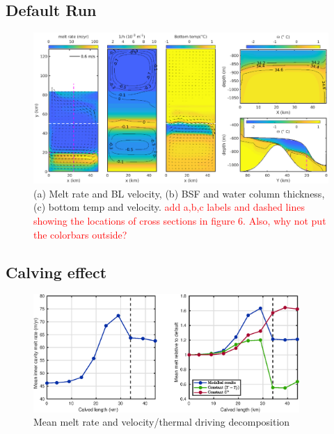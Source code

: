 \documentclass[draft]{agujournal2019}
\newcommand{\red}[1]{\textcolor{red}{#1}}
\begin{document}
\subsection{Default Run}
\begin{figure}
    \centering
    \includegraphics[width = \textwidth]{../make_figures/plots/figure3.eps}
    \caption{(a) Melt rate and BL velocity, (b) BSF and water column thickness, (c) bottom temp and velocity. \red{add a,b,c labels and dashed lines showing the locations of cross sections in figure 6. Also, why not put the colorbars outside?}}
    \label{fig:my_label}
\end{figure}

\subsection{Calving effect}
\begin{figure}
    \centering
    \includegraphics[width = 0.9\textwidth]{../make_figures/plots/figure4.eps}
    \caption{Mean melt rate and velocity/thermal driving decomposition}
    \label{fig:fig4}
\end{figure}
\end{document}
